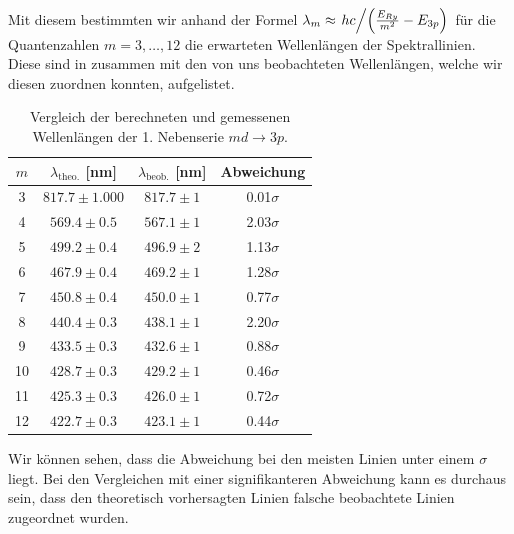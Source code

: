 Mit diesem bestimmten wir anhand der Formel $\lambda_m \approx \flatfrac{hc}{\qty(\frac{E_{Ry}}{m^2} - E_{3p})}$ für die Quantenzahlen $m=3,\dots,12$ die erwarteten Wellenlängen der Spektrallinien. Diese sind in  zusammen mit den von uns beobachteten Wellenlängen, welche wir diesen zuordnen konnten, aufgelistet.

\begin{table}[H]
  \centering
  \caption{Vergleich der berechneten und gemessenen Wellenlängen der 1. Nebenserie $md \to 3p$.}
  \vspace*{0.5em}
  \begin{tabular}{c c c c}
      \hline
      $m$ & $\lambda_{\text{theo.}}$ [nm] & $\lambda_{\text{beob.}}$ [nm] & Abweichung \\
      \hline
      3  & $817.7 \pm 1.000$ & $817.7 \pm 1$ & 0.01$\sigma$ \\
      4  & $569.4 \pm 0.5$ & $567.1 \pm 1$ & 2.03$\sigma$ \\
      5  & $499.2 \pm 0.4$ & $496.9 \pm 2$ & 1.13$\sigma$ \\
      6  & $467.9 \pm 0.4$ & $469.2 \pm 1$ & 1.28$\sigma$ \\
      7  & $450.8 \pm 0.4$ & $450.0 \pm 1$ & 0.77$\sigma$ \\
      8  & $440.4 \pm 0.3$ & $438.1 \pm 1$ & 2.20$\sigma$ \\
      9  & $433.5 \pm 0.3$ & $432.6 \pm 1$ & 0.88$\sigma$ \\
      10 & $428.7 \pm 0.3$ & $429.2 \pm 1$ & 0.46$\sigma$ \\
      11 & $425.3 \pm 0.3$ & $426.0 \pm 1$ & 0.72$\sigma$ \\
      12 & $422.7 \pm 0.3$ & $423.1 \pm 1$ & 0.44$\sigma$ \\
      \hline
  \end{tabular}
  \label{tab:wellenlaengen_1ns_zsmf}
\end{table}

Wir können sehen, dass die Abweichung bei den meisten Linien unter einem $\sigma$ liegt. Bei den Vergleichen mit einer signifikanteren Abweichung kann es durchaus sein, dass den theoretisch vorhersagten Linien falsche beobachtete Linien zugeordnet wurden.